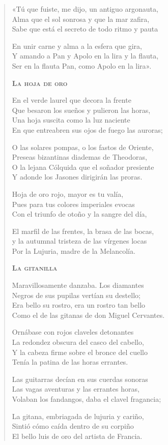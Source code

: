 \documentclass[12pt]{article}
\begin{document}
\begin{verse}
«Tú que fuiste, me dijo, un antiguo argonauta,\\
Alma que el sol sonrosa y que la mar zafira,\\
Sabe que está el secreto de todo ritmo y pauta  

En unir carne y alma a la esfera que gira,\\
Y amando a Pan y Apolo en la lira y la flauta,\\
Ser en la flauta Pan, como Apolo en la lira».  

{\bfseries\scshape {La hoja de oro}}

En el verde laurel que decora la frente\\
Que besaron los sueños y pulieron las horas,\\
Una hoja suscita como la luz naciente\\
En que entreabren sus ojos de fuego las auroras;  

O las solares pompas, o los fastos de Oriente,\\
Preseas bizantinas diademas de Theodoras,\\
O la lejana Cólquida que el soñador presiente\\
Y adonde los Jasones dirigirán las proras.  

Hoja de oro rojo, mayor es tu valía,\\
Pues para tus colores imperiales evocas\\
Con el triunfo de otoño y la sangre del día,  

El marfil de las frentes, la brasa de las bocas,\\
y la autumnal tristeza de las vírgenes locas\\
Por la Lujuria, madre de la Melancolía.  

{\bfseries\scshape {La gitanilla}}

Maravillosamente danzaba. Los diamantes\\
Negros de sus pupilas vertían su destello;\\
Era bello su rostro, era un rostro tan bello\\
Como el de las gitanas de don Miguel Cervantes.  

Ornábase con rojos claveles detonantes\\
La redondez obscura del casco del cabello,\\
Y la cabeza firme sobre el bronce del cuello\\
Tenía la patina de las horas errantes.  

Las guitarras decían en sus cuerdas sonoras\\
Las vagas aventuras y las errantes horas,\\
Volaban los fandangos, daba el clavel fragancia;  

La gitana, embriagada de lujuria y cariño,\\
Sintió cómo caída dentro de su corpiño\\
El bello luis de oro del artista de Francia.  
\end{verse}
\end{document}
